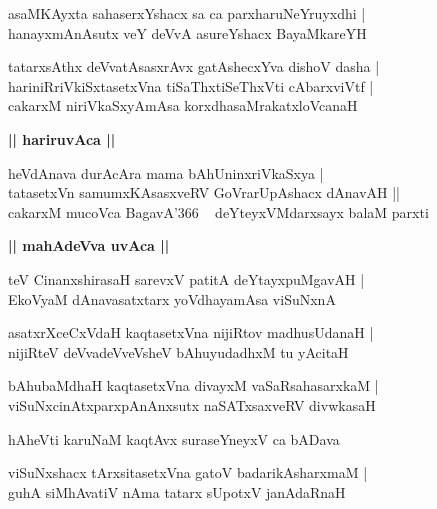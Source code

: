 \documentclass[twoside,12pt,openright]{book}
\newcounter{shloka}[chapter]
\def\uvaca#1{\centerline{{\large\textbf{#1}}}}
\begin{document}
\begin{shloka}%
asaMKAyxta sahaserxYshacx sa ca parxharuNeYruyxdhi |\\
hanayxmAnAsutx veY deVvA asureYshacx BayaMkareYH
\end{shloka}

\begin{shloka}%
tatarxsAthx deVvatAsasxrAvx gatAshecxYva dishoV dasha |\\
hariniRriVkiSxtasetxVna tiSaThxtiSeThxVti cAbarxviVtf |\\
cakarxM niriVkaSxyAmAsa korxdhasaMrakatxloVcanaH 
\end{shloka}

\uvaca{|| hariruvAca ||}

\begin{shloka}%
heVdAnava durAcAra mama bAhUninxriVkaSxya |\\
tatasetxVn samumxKAsasxveRV GoVrarUpAshacx dAnavAH ||\\
cakarxM mucoVca BagavA\char'366 ~ deYteyxVMdarxsayx balaM parxti 
\end{shloka}

\uvaca{|| mahAdeVva uvAca ||}

\begin{shloka}%
teV CinanxshirasaH sarevxV patitA deYtayxpuMgavAH |\\
EkoVyaM dAnavasatxtarx yoVdhayamAsa viSuNxnA 
\end{shloka}

\begin{shloka}%
asatxrXceCxVdaH kaqtasetxVna nijiRtov madhusUdanaH |\\
nijiRteV deVvadeVveVsheV bAhuyudadhxM tu yAcitaH 
\end{shloka}

\begin{shloka}%
bAhubaMdhaH kaqtasetxVna divayxM vaSaRsahasarxkaM |\\
viSuNxcinAtxparxpAnAnxsutx naSATxsaxveRV divwkasaH 
\end{shloka}

\begin{shloka}%
hAheVti karuNaM kaqtAvx suraseYneyxV ca bADava 
\end{shloka}

\begin{shloka}%
viSuNxshacx tArxsitasetxVna gatoV badarikAsharxmaM |\\
guhA siMhAvatiV nAma tatarx sUpotxV janAdaRnaH 
\end{shloka}
\end{document}
